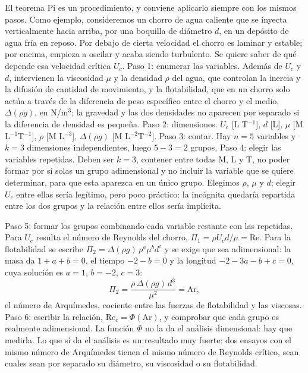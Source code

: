 \documentclass[10pt,openany]{book}
\begin{document}
El teorema Pi es un procedimiento, y conviene aplicarlo siempre con los mismos pasos. Como ejemplo, consideremos un chorro de agua caliente que se inyecta verticalmente hacia arriba, por una boquilla de diámetro \(d\), en un depósito de agua fría en reposo. Por debajo de cierta velocidad el chorro es laminar y estable; por encima, empieza a oscilar y acaba siendo turbulento. Se quiere saber de qué depende esa velocidad crítica \(U_c\). Paso 1: enumerar las variables. Además de \(U_c\) y \(d\), intervienen la viscosidad \(\mu\) y la densidad \(\rho\) del agua, que controlan la inercia y la difusión de cantidad de movimiento, y la flotabilidad, que en un chorro solo actúa a través de la diferencia de peso específico entre el chorro y el medio, \(\Delta(\rho g)\), en N/m\(^3\); la gravedad y las dos densidades no aparecen por separado si la diferencia de densidad es pequeña. Paso 2: dimensiones. \(U_c\) [L T\(^{-1}\)], \(d\) [L], \(\mu\) [M L\(^{-1}\)T\(^{-1}\)], \(\rho\) [M L\(^{-3}\)], \(\Delta(\rho g)\) [M L\(^{-2}\)T\(^{-2}\)]. Paso 3: contar. Hay \(n = 5\) variables y \(k = 3\) dimensiones independientes, luego \(5 - 3 = 2\) grupos. Paso 4: elegir las variables repetidas. Deben ser \(k = 3\), contener entre todas M, L y T, no poder formar por sí solas un grupo adimensional y no incluir la variable que se quiere determinar, para que esta aparezca en un único grupo. Elegimos \(\rho\), \(\mu\) y \(d\); elegir \(U_c\) entre ellas sería legítimo, pero poco práctico: la incógnita quedaría repartida entre los dos grupos y la relación entre ellos sería implícita.

Paso 5: formar los grupos combinando cada variable restante con las repetidas. Para \(U_c\) resulta el número de Reynolds del chorro, \(\Pi_1 = \rho U_c d/\mu = \mathrm{Re}\). Para la flotabilidad se escribe \(\Pi_2 = \Delta(\rho g)\,\rho^{a}\mu^{b}d^{c}\) y se exige que sea adimensional: la masa da \(1 + a + b = 0\), el tiempo \(-2 - b = 0\) y la longitud \(-2 - 3a - b + c = 0\), cuya solución es \(a = 1\), \(b = -2\), \(c = 3\):
\begin{equation}
\Pi_2 = \frac{\rho\,\Delta(\rho g)\,d^{3}}{\mu^{2}} = \mathrm{Ar}, \label{eq:c10-arquimedes}
\end{equation}
el número de Arquímedes, cociente entre las fuerzas de flotabilidad y las viscosas. Paso 6: escribir la relación, \(\mathrm{Re}_c = \Phi(\mathrm{Ar})\), y comprobar que cada grupo es realmente adimensional. La función \(\Phi\) no la da el análisis dimensional: hay que medirla. Lo que sí da el análisis es un resultado muy fuerte: dos ensayos con el mismo número de Arquímedes tienen el mismo número de Reynolds crítico, sean cuales sean por separado su diámetro, su viscosidad o su flotabilidad.
\end{document}
